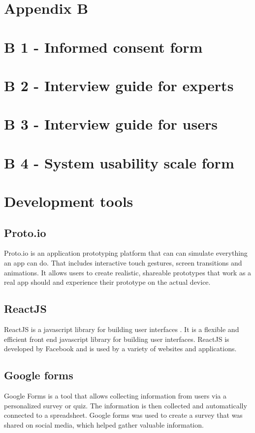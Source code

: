 \section{Appendix B}
\section{B 1 - Informed consent form}


\section{B 2 - Interview guide for experts}


\section{B 3 - Interview guide for users}

\section{B 4 - System usability scale form}


\section{Development tools}
\subsection{Proto.io}
Proto.io is an application prototyping platform \cite{proto} that can can simulate everything an app can do. That includes interactive touch gestures, screen transitions and animations. It allows users to create realistic, shareable prototypes that work as a real app should and experience their prototype on the actual device.
\subsection{ReactJS}
ReactJS is a javascript library for building user interfaces \cite{react}. It is a flexible and efficient front end javascript library for building user interfaces\cite{react2}. ReactJS is developed by Facebook and is used by a variety of websites and applications. 

\subsection{Google forms}
Google Forms is a tool that allows collecting information from users via a personalized survey or quiz. The information is then collected and automatically connected to a spreadsheet\cite{forms}. Google forms was used to create a survey that was shared on social media, which helped gather valuable information.
